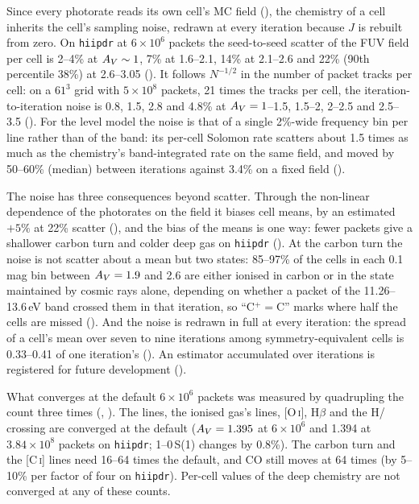 Since every photorate reads its own cell's MC field (), the
chemistry of a cell inherits the cell's sampling noise, redrawn at every
iteration because $J$ is rebuilt from zero. On \texttt{hiipdr} at
$6\times10^6$ packets the seed-to-seed scatter of the FUV field per cell is
2--4\% at $A_{V}\sim1$, 7\% at 1.6--2.1, 14\% at 2.1--2.6 and 22\% (90th percentile
38\%) at 2.6--3.05 (). It follows $N^{-1/2}$ in the number of packet
tracks per cell: on a $61^3$ grid with $5\times10^8$ packets, 21 times the tracks
per cell, the iteration-to-iteration noise is 0.8, 1.5, 2.8 and 4.8\% at
$A_{V}=1$--1.5, 1.5--2, 2--2.5 and 2.5--3.5 (). For the level model the
noise is that of a single 2\%-wide frequency bin per line rather than of the
band: its per-cell Solomon rate scatters about 1.5 times as much as the
chemistry's band-integrated rate on the same field, and moved by 50--60\%
(median) between iterations against 3.4\% on a fixed field ().

The noise has three consequences beyond scatter. Through the non-linear
dependence of the photorates on the field it biases cell means, by an
estimated $+5\%$ at 22\% scatter (), and the bias of the means is one
way: fewer packets give a shallower carbon turn and colder deep gas on
\texttt{hiipdr} (). At the carbon turn the noise is not scatter about
a mean but two states: 85--97\% of the cells in each 0.1\,mag bin between
$A_{V}=1.9$ and 2.6 are either ionised in carbon or in the state maintained by
cosmic rays alone, depending on whether a packet of the 11.26--13.6\,eV band
crossed them in that iteration, so ``C$^+=$C'' marks where half the cells are
missed (). And the noise is redrawn in full at every iteration: the
spread of a cell's mean over seven to nine iterations among
symmetry-equivalent cells is 0.33--0.41 of one iteration's (). An
estimator accumulated over iterations is registered for future development
().

What converges at the default $6\times10^6$ packets was measured by
quadrupling the count three times (, ). The \Htwo{} lines,
the ionised gas's lines, [O\,\textsc{i}], H$\beta$ and the H/\Htwo{} crossing are
converged at the default ($A_{V}=1.395$ at $6\times10^6$ and 1.394 at
$3.84\times10^8$ packets on \texttt{hiipdr}; 1--0\,S(1) changes by 0.8\%). The
carbon turn and the [C\,\textsc{i}] lines need 16--64 times the default, and CO
still moves at 64 times (by 5--10\% per factor of four on \texttt{hiipdr}).
Per-cell values of the deep chemistry are not converged at any of these
counts.

